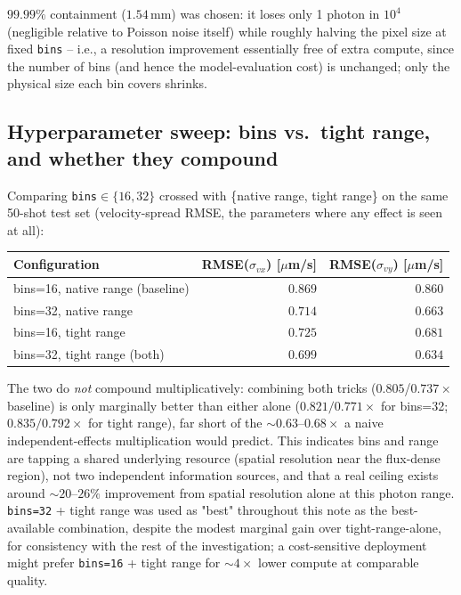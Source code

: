 \documentclass[11pt,a4paper]{article}
\newcommand{\code}[1]{\texttt{#1}}
\begin{document}
$99.99\%$ containment ($1.54\,$mm) was chosen: it loses only 1 photon in
$10^4$ (negligible relative to Poisson noise itself) while roughly halving
the pixel size at fixed \code{bins} -- i.e., a resolution improvement
essentially free of extra compute, since the number of bins (and hence the
model-evaluation cost) is unchanged; only the physical size each bin covers
shrinks.

\subsection{Hyperparameter sweep: bins vs.\ tight range, and whether they
compound}
\label{sec:hp}

Comparing \code{bins}$\in\{16,32\}$ crossed with \{native range, tight
range\} on the same 50-shot test set (velocity-spread RMSE, the parameters
where any effect is seen at all):

\begin{center}
\begin{tabular}{lrr}
\toprule
Configuration & RMSE($\sigma_{vx}$) [$\mu$m/s] & RMSE($\sigma_{vy}$) [$\mu$m/s] \\
\midrule
bins=16, native range (baseline)  & $0.869$ & $0.860$ \\
bins=32, native range             & $0.714$ & $0.663$ \\
bins=16, tight range              & $0.725$ & $0.681$ \\
bins=32, tight range (both)       & $0.699$ & $0.634$ \\
\bottomrule
\end{tabular}
\end{center}

The two do \emph{not} compound multiplicatively: combining both tricks
($0.805$/$0.737\times$ baseline) is only marginally better than either
alone ($0.821/0.771\times$ for bins=32; $0.835/0.792\times$ for tight
range), far short of the $\sim\!0.63$--$0.68\times$ a naive independent-effects
multiplication would predict. This indicates bins and range are tapping a
shared underlying resource (spatial resolution near the flux-dense region),
not two independent information sources, and that a real ceiling exists
around $\sim\!20$--$26\%$ improvement from spatial resolution alone at this
photon range. \code{bins=32} + tight range was used as "best" throughout
this note as the best-available combination, despite the modest marginal
gain over tight-range-alone, for consistency with the rest of the
investigation; a cost-sensitive deployment might prefer \code{bins=16} +
tight range for $\sim\!4\times$ lower compute at comparable quality.
\end{document}
